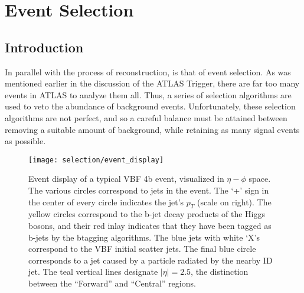 \chapter{Event Selection} \label{chapter:selection}

\section{Introduction}

    In parallel with the process of reconstruction, is that of event selection.
    As was mentioned earlier in the discussion of the ATLAS Trigger,
        there are far too many events in ATLAS to analyze them all.
    Thus, a series of selection algorithms are used to veto the abundance of background events.
    Unfortunately, these selection algorithms are not perfect,
        and so a careful balance must be attained between removing a suitable amount of background,
        while retaining as many signal events as possible.

    \begin{figure}[tbh]
        \texttt{[image: selection/event\_display]}
        \caption{
            Event display of a typical VBF \to 4b event, visualized in $\eta-\phi$ space.
            The various circles correspond to jets in the event.
            The `+' sign in the center of every circle indicates the jet's $p_T$ (scale on right).
            The yellow circles correspond to the b-jet decay products of the Higgs bosons,
                and their red inlay indicates that they have been tagged as b-jets by the btagging algorithms.
            The blue jets with white `X's correspond to the VBF initial scatter jets.
            The final blue circle corresponds to a jet caused by a particle radiated by the nearby ID jet.
            The teal vertical lines designate $|\eta|=2.5$,
                the distinction between the ``Forward'' and ``Central'' regions.
        }
        \label{fig:event_display}
    \end{figure}

    
